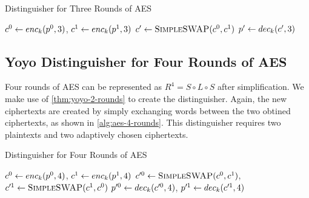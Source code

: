 \documentclass[twoside]{article}
\begin{document}
\begin{algorithm}
    \caption{Distinguisher for Three Rounds of AES}
    \label{alg:aes-3-rounds}
    \begin{algorithmic}[1]
        \State \(c^0 \gets enc_k(p^0, 3)\), \(c^1 \gets enc_k(p^1,
        3)\)
        \State \(c^\prime \gets \textsc{SimpleSWAP}(c^0, c^1)\)
        \State \(p^\prime \gets dec_k(c^\prime, 3)\)
            \State {}
        \Else
            \State {}
        \EndIf
    \end{algorithmic}
\end{algorithm}

\subsection{Yoyo Distinguisher for Four Rounds of AES}

Four rounds of AES can be represented as \(R^4 = S \circ L \circ S\) after
simplification. We make use of \autoref{thm:yoyo-2-rounds} to create the
distinguisher. Again, the new ciphertexts are created by simply exchanging words
between the two obtined ciphertexts, as shown in \autoref{alg:aes-4-rounds}.
This distinguisher requires two plaintexts and two adaptively chosen
ciphertexts.

\begin{algorithm}
    \caption{Distinguisher for Four Rounds of AES}
    \label{alg:aes-4-rounds}
    \begin{algorithmic}[1]
        \State \(c^0 \gets enc_k(p^0, 4)\), \(c^1 \gets enc_k(p^1,
        4)\)
        \State \(c^{\prime 0} \gets \textsc{SimpleSWAP}(c^0, c^1)\),
        \(c^{\prime 1} \gets \textsc{SimpleSWAP}(c^1, c^0)\)
        \State \(p^{\prime 0} \gets dec_k(c^{\prime 0}, 4)\), \(p^{\prime
        1} \gets dec_k(c^{\prime 1}, 4)\)
            \State {}
        \Else
            \State {}
        \EndIf
    \end{algorithmic}
\end{algorithm}
\end{document}
